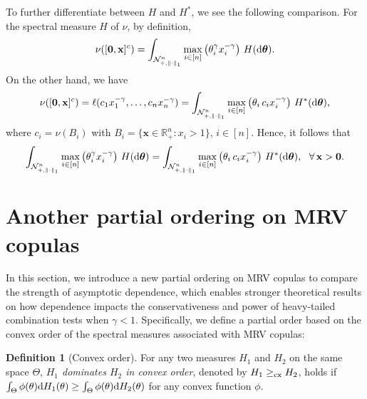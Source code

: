 \documentclass[12pt]{article}
\theoremstyle{plain}
\theoremstyle{plain}
\theoremstyle{definition}
\newtheorem{defn}{Definition}[section]
\newcommand{\R}{\mathbb{R}}
\newcommand{\punitsphereone}[1]{\mathcal{N}_{+,\|\cdot\|_1}^{#1}}
\begin{document}
To further differentiate between $H$ and $H^*$, we see the following comparison. For the spectral measure $H$ of $\nu$, by definition,
\[
\nu([{\bf 0},{\bf x}]^c)= \int_{\punitsphereone{n}}
\max_{i\in[n]} \left(\theta_i^\gamma x_i^{-\gamma}\right)\,H(\mathrm{d}{\boldsymbol{\theta}}).
\]
On the other hand, we have
\[
\nu([{\bf 0},{\bf x}]^c)
=\ell(c_1x_1^{-\gamma},\dots,c_nx_n ^{-\gamma})
= {\int_{\punitsphereone{n}}
	\max_{i\in[n]}
	\left(
	{\theta_i}  \, c_ix_i^{-\gamma}
	\right)
	\, H^*(\mathrm{d}\boldsymbol{\theta})},
\]
where $c_i = \nu(B_i)$ with $B_i=\{\mathbf{x}\in\R_+^n:x_i>1\}$, $i\in [n]$.
Hence, it follows that 
\[
\int_{\punitsphereone{n}}
\max_{i\in[n]} \left(\theta_i^\gamma x_i^{-\gamma}\right)\,H(\mathrm{d}{\boldsymbol{\theta}})
=
{\int_{\punitsphereone{n}}
	\max_{i\in[n]}
	\left(
	{\theta_i}  \, c_ix_i^{-\gamma}
	\right)
	\, H^*(\mathrm{d}\boldsymbol{\theta})},
~~\forall \, {\bf x}>{\bf 0}.
\]

\section{Another partial ordering on MRV copulas}
\label{sec:dependence-vs-combination-test}
In this section, we introduce a new partial ordering on MRV copulas to compare the strength of asymptotic dependence, which enables stronger theoretical results on how dependence impacts the conservativeness and power of heavy-tailed combination tests when $\gamma < 1$. Specifically, we define a partial order based on the convex order of the spectral measures associated with MRV copulas:


\begin{defn}[Convex order]
    For any two measures $H_1$ and $H_2$ on the same space $\Theta$, \emph{$H_1$ dominates $H_2$ in convex order}, denoted by $H_1\ge_{\rm cx} H_2 $, holds if $\int_\Theta   \phi({\mathbf \theta}) {\rm d} H_1({\mathbf \theta}) \ge \int_\Theta \phi({\mathbf \theta}) {\rm d} H_2({\mathbf \theta})$ for any convex function $\phi$.
\end{defn}
 
\end{document}
